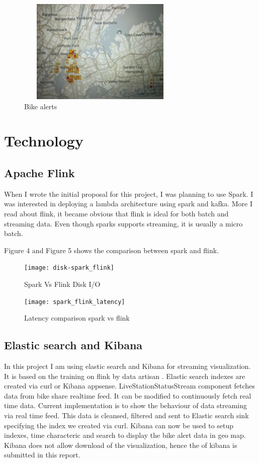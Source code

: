 \documentclass{sig-alternate-05-2015}
\begin{document}
\begin{figure}[!ht]
\includegraphics[width=8cm, height=5cm]{bikealerts}
 \caption{Bike alerts}\label{F:small}
\end{figure}


\section{Technology}
\subsection{Apache Flink}
When I wrote the initial proposal for this project, I was planning to use Spark. I was interested in deploying a lambda architecture using spark and kafka. More I read about flink, it became obvious that flink is ideal for both batch and streaming data. Even though sparks supports streaming, it is usually a micro batch.

\cite{kjacobs} Figure 4 and Figure 5 shows the comparison between spark and flink.

\begin{figure}[!ht]
\texttt{[image: disk-spark\_flink]}
 \caption{Spark Vs Flink Disk I/O}\label{F:small}
\end{figure}

\begin{figure}[!ht]
\texttt{[image: spark\_flink\_latency]}
 \caption{Latency comparison spark vs flink}\label{F:small}
\end{figure}
\break
\break

\subsection{Elastic search and Kibana}
In this project I am using elastic search and Kibana for streaming visualization. It is based on the training on flink by data artisan \cite{artisan}. Elastic search indexes are created via curl or Kibana appsense. LiveStationStatusStream component fetches data from bike share realtime feed. It can be modified to continuously fetch real time data. Current implementation is to show the behaviour of data streaming via real time feed. This data is cleansed, filtered and sent to Elastic search sink specifying the index we created via curl. Kibana can now be used to setup indexes, time characteric and search to display the bike alert data in geo map. Kibana does not allow download of the visualization, hence the   of kibana is submitted in this report.
\end{document}
